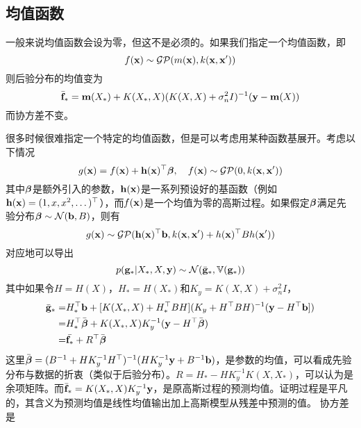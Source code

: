 \documentclass[12pt,UTF8]{article}
\begin{document}
        \subsection{均值函数}
            一般来说均值函数会设为零，但这不是必须的。如果我们指定一个均值函数，即
            \begin{equation}
                f(\vb{x})\sim\mathcal{GP}(m(\vb{x}),k(\vb{x},\vb{x}'))
            \end{equation}
            则后验分布的均值变为
            \begin{equation}
                \bar{\vb{f}}_*=\vb{m}(X_*)+K(X_*,X)(K(X,X)+\sigma_n^2I)^{-1}(\vb{y}-\vb{m}(X))
            \end{equation}
            而协方差不变。\par
            很多时候很难指定一个特定的均值函数，但是可以考虑用某种函数基展开。考虑以下情况
            \begin{equation}
                g(\vb{x})=f(\vb{x})+\vb{h}(\vb{x})^\top\vb*{\beta}\qc f(\vb{x})\sim\mathcal{GP}(0,k(\vb{x},\vb{x}'))
            \end{equation}
            其中$\vb*{\beta}$是额外引入的参数，$\vb{h}(\vb{x})$是一系列预设好的基函数（例如$\vb{h}(\vb{x})=(1,x,x^2,\dots)^\top$），而$f(\vb{x})$是一个均值为零的高斯过程。如果假定$\vb*{\beta}$满足先验分布$\vb*{\beta}\sim\mathcal{N}(\vb{b},B)$，则有
            \begin{equation}
                g(\vb{x})\sim\mathcal{GP}(\vb{h}(\vb{x})^\top\vb{b},k(\vb{x},\vb{x}')+h(\vb{x})^\top Bh(\vb{x}'))
            \end{equation}
            对应地可以导出
            \begin{equation}
                p(\vb{g}_*|X_*,X,\vb{y})\sim\mathcal{N}(\bar{\vb{g}}_*,\mathbb{V}(\vb{g}_*))
            \end{equation}
            其中如果令$H=H(X)$，$H_*=H(X_*)$和$K_y=K(X,X)+\sigma_n^2I$，
            \begin{align}
                \bar{\vb{g}}_*=&H_*^\top\vb{b}+[K(X_*,X)+H_*^\top BH](K_y+H^\top BH)^{-1}(\vb{y}-H^\top\vb{b}]) \\
                =&H_*^\top\bar{\vb*{\beta}}+K(X_*,X)K_y^{-1}(\vb{y}-H^\top\bar{\vb*{\beta}}) \\
                =&\bar{\vb{f}_*}+R^\top\bar{\vb*{\beta}}
            \end{align}
            这里$\bar{\vb*{\beta}}=(B^{-1}+HK_y^{-1}H^\top)^{-1}(HK_y^{-1}\vb{y}+B^{-1}\vb{b})$，是参数的均值，可以看成先验分布与数据的折衷（类似于后验分布）。$R=H_*-HK_y^{-1}K(X,X_*)$，可以认为是余项矩阵。而$\bar{\vb{f}}_*=K(X_*,X)K_y^{-1}\vb{y}$，是原高斯过程的预测均值。证明过程是平凡的，其含义为预测均值是线性均值输出加上高斯模型从残差中预测的值。 协方差是
\end{document}
